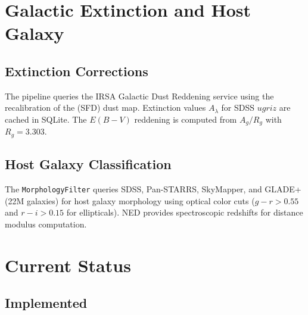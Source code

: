 \documentclass[11pt,letterpaper]{article}
\begin{document}
\section{Galactic Extinction and Host Galaxy}
\label{sec:environment}

\subsection{Extinction Corrections}

The pipeline queries the IRSA Galactic Dust Reddening service using the
\citet{Schlafly2011} recalibration of the \citet{Schlegel1998} (SFD)
dust map.  Extinction values $A_\lambda$ for SDSS $ugriz$ are cached in
SQLite.  The $E(B\!-\!V)$ reddening is computed from $A_g / R_g$ with
$R_g = 3.303$.

\subsection{Host Galaxy Classification}

The \texttt{MorphologyFilter} queries SDSS, Pan-STARRS, SkyMapper, and
GLADE+ (22M galaxies) for host galaxy morphology using optical color
cuts ($g-r > 0.55$ and $r-i > 0.15$ for ellipticals).  NED provides
spectroscopic redshifts for distance modulus computation.


\section{Current Status}
\label{sec:status}

\subsection{Implemented}
\end{document}
